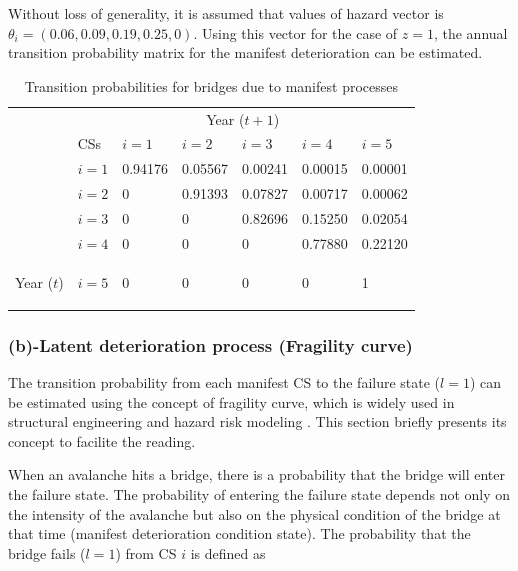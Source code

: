 \documentclass[fleqn]{article}
\begin{document}
Without loss of generality, it is assumed that values of hazard vector is $\theta_i =(0.06,0.09,0.19,0.25,0)$. Using this vector for the case of $z=1$, the annual transition probability matrix for the manifest deterioration can be estimated.


\begin{table}[H]
\caption{Transition probabilities for bridges due to manifest processes}
\begin{center}
\begin{tabular}{l|l|lllll}
\hline
\multicolumn{1}{l}{} & \multicolumn{6}{c}{Year ($t+1$)} \\ 
\cline{2-7}
 & CSs & $i=1$ & $i=2$ & $i=3$ & $i=4$ & $i=5$ \\ 
\cline{2-7}
 & $i=1$ & 0.94176 & 0.05567 & 0.00241 & 0.00015 & 0.00001 \\ 
 & $i=2$ & 0 & 0.91393 & 0.07827 & 0.00717 & 0.00062 \\ 
& $i=3$ & 0 & 0 & 0.82696 & 0.15250 & 0.02054 \\ 
 & $i=4$ & 0 & 0 & 0 & 0.77880 & 0.22120 \\ 
 \begin{rotate}{90} Year ($t$) \end{rotate} & $i=5$ & 0 & 0 & 0 & 0 & 1 \\ 
\hline
\end{tabular}
\end{center}
\label{transitionmatrixa}
\end{table}
%
\subsubsection*{(b)-Latent deterioration process (Fragility curve)}
The transition probability from each manifest CS to the failure state ($l=1$) can be estimated using the concept of fragility curve, which is widely used in structural engineering and hazard risk modeling \citep{Karim2001, Choi2004, Mayet2002, Graf2009}. This section briefly presents its concept to facilite the reading.

When an avalanche hits a bridge, there is a probability that the bridge will enter the failure state. The probability of entering the failure state depends not only on the intensity of the avalanche but also on the physical condition of the bridge at that time (manifest deterioration condition state). The probability that the bridge fails ($l=1$) from CS $i$ is defined as
\end{document}
